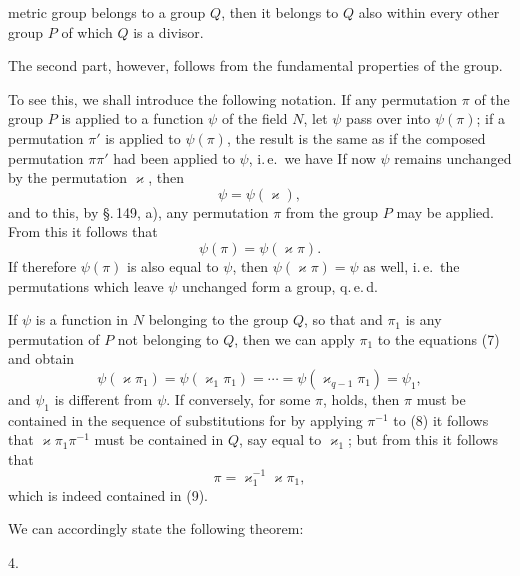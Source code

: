 
metric group belongs to a group $Q$, then it belongs to $Q$ also within every other group $P$ of which $Q$ is a divisor.

The second part, however, follows from the fundamental properties of the  group.

To see this, we shall introduce the following notation. If any permutation $\pi$ of the group $P$ is applied to a function $\psi$ of the field $N$, let $\psi$ pass over into $\psi(\pi)$; if a permutation $\pi'$ is applied to $\psi(\pi)$, the result is the same as if the composed permutation $\pi\pi'$ had been applied to $\psi$, i.\,e.\ we have
If now $\psi$ remains unchanged by the permutation $\varkappa$, then
\[
\psi = \psi(\varkappa),
\]
and to this, by \S.\,149, a), any permutation $\pi$ from the group $P$ may be applied. From this it follows that
\[
\psi(\pi) = \psi(\varkappa\pi).
\]
If therefore $\psi(\pi)$ is also equal to $\psi$, then $\psi(\varkappa\pi) = \psi$ as well, i.\,e.\ the permutations which leave $\psi$ unchanged form a group, q.\,e.\,d.

If $\psi$ is a function in $N$ belonging to the group $Q$, so that
and $\pi_1$ is any permutation of $P$ not belonging to $Q$, then we can apply $\pi_1$ to the equations (7) and obtain
\[
\psi(\varkappa\pi_1) = \psi(\varkappa_1\pi_1) = \cdots = \psi(\varkappa_{q-1}\pi_1) = \psi_1,
\]
and $\psi_1$ is different from $\psi$. If conversely, for some $\pi$,
holds, then $\pi$ must be contained in the sequence of substitutions
for by applying $\pi^{-1}$ to (8) it follows that $\varkappa\pi_1\pi^{-1}$ must be contained in $Q$, say equal to $\varkappa_1$; but from this it follows that
\[
\pi = \varkappa_1^{-1}\varkappa\pi_1,
\]
which is indeed contained in (9).

We can accordingly state the following theorem:

4. 
